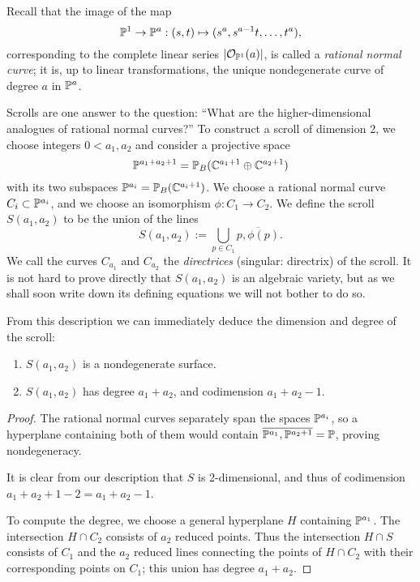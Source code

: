 Recall that the image of the map 
$$
\PP^1\to\PP^a: (s,t) \mapsto (s^a, s^{a-1}t, \dots, t^a),
$$
corresponding to the complete linear series
$|\cO_{\PP^1}(a)|$, is called a \emph{rational normal curve}; it is, up to linear transformations, the unique nondegenerate curve of degree $a$ in $\PP^a$.

Scrolls are one answer to the question: ``What are the higher-dimensional analogues of rational normal curves?'' To construct a scroll of dimension 2, we choose integers $0<a_1, a_2$ and consider  a projective space 
$$
\PP^{a_1+a_2+1} = \PP_B(\CC^{a_1+1}\oplus \CC^{a_2+1})
$$
with its two subspaces $\PP^{a_i} = \PP_B(\CC^{a_i+1})$. We choose a rational normal curve $C_i\subset \PP^{a_i}$, and we choose an isomorphism $\phi: C_1\to C_2$. We define the scroll $S(a_1, a_2)$ to be the union of the lines
$$
S(a_1,a_2) := \bigcup_{p\in C_1} \overline{p, \phi(p)}.
$$
We call the curves $C_{a_{1}}$ and $C_{a_{2}}$ the \emph{directrices} (singular: directrix) of the scroll.
It is not hard to prove directly that $S(a_1,a_2)$ is an algebraic variety, but as we shall soon write down its defining equations we will not bother to do so. 

From this description we can immediately deduce the dimension and degree of the scroll:
\begin{proposition}
\begin{enumerate}
\item $S(a_1,a_2)$ is a nondegenerate surface.
 \item $S(a_1,a_2)$ has degree $a_1+a_2$, and codimension $a_1+a_2-1.$
 \end{enumerate}

\end{proposition}\label{deg and codim}
\begin{proof}
 The rational normal curves separately span the spaces $\PP^{a_i}$, so a hyperplane containing both of them would contain $\overline{\PP^{a_1}, \PP^{a_{2}+1}} = \PP$, proving nondegeneracy. 
 
 It is clear from our description that $S$ is 2-dimensional, and thus of
codimension $a_{1}+a_{2}+1 -2 = a_{1}+a_{2}-1$. 

To compute the degree, we choose a general hyperplane $H$ containing $\PP^{a_{1}}$. The intersection $H\cap C_{2}$ consists of $a_{2}$ reduced points. Thus the intersection $H\cap S$ consists of $C_{1}$ and the $a_{2}$ reduced lines connecting 
the points of $H\cap C_{2}$ with their corresponding points on $C_{1}$; this union has degree $a_{1}+a_{2}$.
\end{proof}

